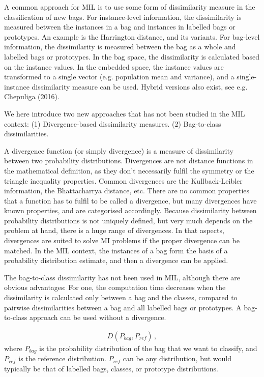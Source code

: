 A common approach for MIL is to use some form of dissimilarity measure in the classification of new bags. 
For instance-level information, the dissimilarity is measured between the instances in a bag and instances in labelled bags or prototypes. 
An example is the Harrington distance, and its variants. 
For bag-level information, the dissimilarity is measured between the bag as a whole and labelled bags or prototypes. 
{\color{red} In the bag space, the dissimilarity is calculated based on the instance values.}
In the embedded space, the instance values are transformed to a single vector (e.g. population mean and variance), and a single-instance dissimilarity measure can be used. 
Hybrid versions also exist, see e.g. {\color{green} Chepuliga (2016)}. 

We here introduce two new approaches that has not been studied in the MIL context: 
(1) Divergence-based dissimilarity measures. 
(2) Bag-to-class dissimilarities. 

A divergence function (or simply divergence) is a measure of dissimilarity between two probability distributions.
Divergences are not distance functions in the mathematical definition, as they don't necessarily fulfil the symmetry or the triangle inequality properties. 
Common divergences are the Kullback-Leibler information, the Bhattacharrya distance, etc. 
There are no common properties that a function has to fulfil to be called a divergence, but many divergences have known properties, and are categorised accordingly. 
Because dissimilarity between probability distributions is not uniquely defined, but very much depends on the problem at hand, there is a huge range of divergences. 
In that aspects, divergences are suited to solve MI problems if the proper divergence can be matched. 
In the MIL context, the instances of a bag form the basis of a probability distribution estimate, and then a divergence can be applied. 

The bag-to-class dissimilarity has not been used in MIL, although there are obvious advantages:
For one, the computation time decreases when the dissimilarity is calculated only between a bag and the classes, compared to pairwise dissimilarities between a bag and all labelled bags or prototypes. 
A bag-to-class approach can be used without a divergence. 

\begin{align}
  D(P_{bag}, P_{ref})\, ,
\end{align}
where $P_{bag}$ is the probability distribution of the bag that we want to classify, and $P_{ref}$ is the reference distribution. 
$P_{ref}$ can be any distribution, but would typically be that of labelled bags, classes, or prototype distributions. 

